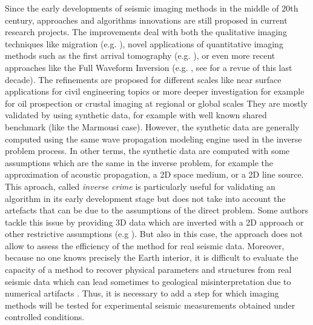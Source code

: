 \documentclass[manuscript,revised]{geophysics}
\begin{document}
\noindent Since the early developments of seismic imaging methods in the middle of 20th century, approaches and algorithms innovations are still proposed in current research projects. The improvements deal with both the qualitative imaging techniques like migration (e.g. \citet{Berkhout_MSS_2012,Guofeng_GPU_2013}), novel applications of quantitative imaging methods such as the first arrival tomography (e.g. \citet{Bohm_CWS_2015}), or even more recent approaches like the Full Waveform Inversion (e.g. \citet{Perez_AWI_2014}, see \citet{Virieux_FWI_2009} for a revue of this last decade). The refinements are proposed for different scales like near surface applications for civil engineering topics or more deeper investigation for example for oil prospection or crustal imaging at regional or global scales They are mostly validated by using synthetic data, for example with well known shared benchmark (like the Marmousi case). However, the synthetic data are generally computed using the same wave propagation modeling engine used in the inverse problem process. In other terms, the synthetic data are computed with some assumptions which are the same in the inverse problem, for example the approximation of acoustic propagation, a 2D space medium, or a 2D line source. This aproach, called \textit{inverse crime} \citep{Wirgin_TIC_2004} is particularly useful for validating an algorithm in its early development stage but does not take into account the artefacts that can be due to the assumptions of the direct problem. Some authors tackle this issue by providing 3D data which are inverted with a 2D approach or other restrictive assumptions (e.g ). But also in this case, the approach does not allow to assess the efficiency of the method for real seismic data. Moreover, because no one knows precisely the Earth interior, it is difficult to evaluate the capacity of a method to recover physical parameters and structures from real seismic data which can lead sometimes to geological misinterpretation due to numerical artifacts \citep{Morozov_ARF_2004}. Thus, it is necessary to add a step for which imaging methods will be tested for experimental seismic measurements obtained under controlled conditions.
	
\end{document}
